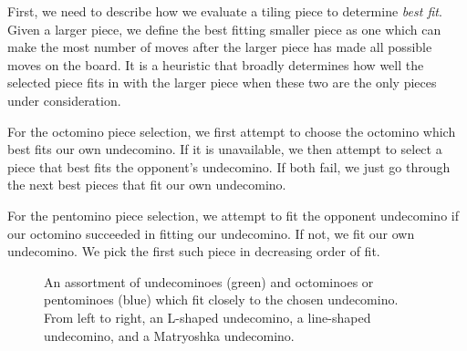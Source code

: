 \documentclass{scrartcl}
\begin{document}
First, we need to describe how we evaluate a tiling piece to determine \textit{best fit}. Given a larger piece, we define the best fitting smaller piece as one which can make the most number of moves after the larger piece has made all possible moves on the board. It is a heuristic that broadly determines how well the selected piece fits in with the larger piece when these two are the only pieces under consideration.

For the octomino piece selection, we first attempt to choose the octomino which best fits our own undecomino. If it is unavailable, we then attempt to select a piece that best fits the opponent's undecomino. If both fail, we just go through the next best pieces that fit our own undecomino.

For the pentomino piece selection, we attempt to fit the opponent undecomino if our octomino succeeded in fitting our undecomino. If not, we fit our own undecomino. We pick the first such piece in decreasing order of fit.

\begin{figure}[h]
\centering
{}
\caption{An assortment of undecominoes (green) and octominoes or pentominoes (blue) which fit closely to the chosen undecomino. From left to right, an L-shaped undecomino, a line-shaped undecomino, and a Matryoshka undecomino.}\label{fig:fitting}
\end{figure}
\end{document}
